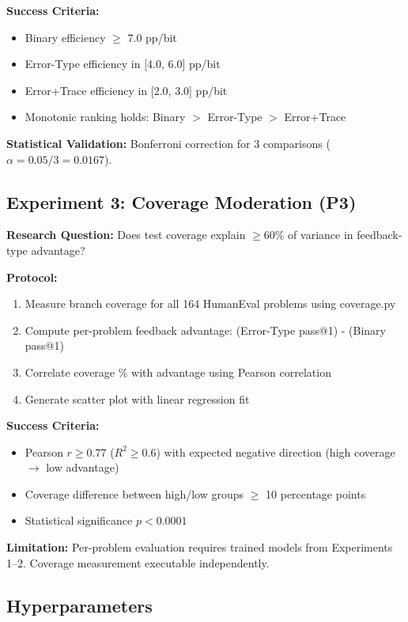 \textbf{Success Criteria:}
\begin{itemize}
\item Binary efficiency $\geq$ 7.0 pp/bit
\item Error-Type efficiency in [4.0, 6.0] pp/bit
\item Error+Trace efficiency in [2.0, 3.0] pp/bit
\item Monotonic ranking holds: Binary $>$ Error-Type $>$ Error+Trace
\end{itemize}

\textbf{Statistical Validation:} Bonferroni correction for 3 comparisons ($\alpha=0.05/3=0.0167$).

\subsection{Experiment 3: Coverage Moderation (P3)}

\textbf{Research Question:} Does test coverage explain $\geq$60\% of variance in feedback-type advantage?

\textbf{Protocol:}
\begin{enumerate}
\item Measure branch coverage for all 164 HumanEval problems using coverage.py
\item Compute per-problem feedback advantage: (Error-Type pass@1) - (Binary pass@1)
\item Correlate coverage \% with advantage using Pearson correlation
\item Generate scatter plot with linear regression fit
\end{enumerate}

\textbf{Success Criteria:}
\begin{itemize}
\item Pearson $r \geq 0.77$ ($R^2 \geq 0.6$) with expected negative direction (high coverage $\rightarrow$ low advantage)
\item Coverage difference between high/low groups $\geq$ 10 percentage points
\item Statistical significance $p < 0.0001$
\end{itemize}

\textbf{Limitation:} Per-problem evaluation requires trained models from Experiments 1--2. Coverage measurement executable independently.

\subsection{Hyperparameters}

